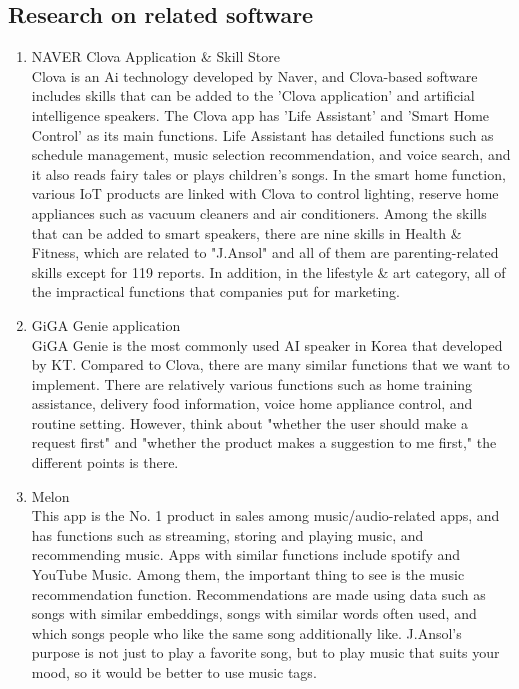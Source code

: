 \documentclass[conference]{IEEEtran}
\begin{document}
\subsection{Research on related software}

\begin{enumerate}
    \item NAVER Clova Application \& Skill Store\\
	Clova is an Ai technology developed by Naver, and Clova-based software includes skills that can be added to the 'Clova application' and artificial intelligence speakers. The Clova app has 'Life Assistant' and 'Smart Home Control' as its main functions. Life Assistant has detailed functions such as schedule management, music selection recommendation, and voice search, and it also reads fairy tales or plays children's songs. In the smart home function, various IoT products are linked with Clova to control lighting, reserve home appliances such as vacuum cleaners and air conditioners. Among the skills that can be added to smart speakers, there are nine skills in Health \& Fitness, which are related to "J.Ansol" and all of them are parenting-related skills except for 119 reports. In addition, in the lifestyle \& art category, all of the impractical functions that companies put for marketing.\\
    
    \item GiGA Genie application\\
    GiGA Genie is the most commonly used AI speaker in Korea that developed by KT. Compared to Clova, there are many similar functions that we want to implement. There are relatively various functions such as home training assistance, delivery food information, voice home appliance control, and routine setting. However, think about "whether the user should make a request first" and "whether the product makes a suggestion to me first," the different points is there.\\
    
    \item Melon\\
    This app is the No. 1 product in sales among music/audio-related apps, and has functions such as streaming, storing and playing music, and recommending music. Apps with similar functions include spotify and YouTube Music. Among them, the important thing to see is the music recommendation function. Recommendations are made using data such as songs with similar embeddings, songs with similar words often used, and which songs people who like the same song additionally like. 
    J.Ansol's purpose is not just to play a favorite song, but to play music that suits your mood, so it would be better to use music tags.\\
    

\end{enumerate}
\end{document}
